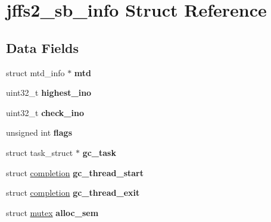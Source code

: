 \hypertarget{structjffs2__sb__info}{}\section{jffs2\+\_\+sb\+\_\+info Struct Reference}
\label{structjffs2__sb__info}
\subsection*{Data Fields}
\begin{DoxyCompactItemize}
\item 
\mbox{\label{structjffs2__sb__info_a4fc438f81838d3839d57f85c8c536859}} 
struct mtd\+\_\+info $\ast$ {\bfseries mtd}
\item 
\mbox{\label{structjffs2__sb__info_a8c24263d5c9b631d56e2a416c4828e32}} 
uint32\+\_\+t {\bfseries highest\+\_\+ino}
\item 
\mbox{\label{structjffs2__sb__info_a955083b968410d9096f6936f01c4c2cb}} 
uint32\+\_\+t {\bfseries check\+\_\+ino}
\item 
\mbox{\label{structjffs2__sb__info_a57ab69c2641ad4eba81fa92dab43bd8b}} 
unsigned int {\bfseries flags}
\item 
\mbox{\label{structjffs2__sb__info_ab18f6a89fdc140db5bdce82377de4a8d}} 
struct task\+\_\+struct $\ast$ {\bfseries gc\+\_\+task}
\item 
\mbox{\label{structjffs2__sb__info_abb08e44794739b8bf72bc81d42433207}} 
struct \mbox{\hyperlink{structcompletion}{completion}} {\bfseries gc\+\_\+thread\+\_\+start}
\item 
\mbox{\label{structjffs2__sb__info_a05c67aa93342f43c6510e8c881455d9a}} 
struct \mbox{\hyperlink{structcompletion}{completion}} {\bfseries gc\+\_\+thread\+\_\+exit}
\item 
\mbox{\label{structjffs2__sb__info_a29d49743eb479da60cb4bce2e50c021a}} 
struct \mbox{\hyperlink{structmutex}{mutex}} {\bfseries alloc\+\_\+sem}
\item 
\mbox{\label{structjffs2__sb__info_a6520f9f9873082530494050b3d8f924c}} 

\end{DoxyCompactItemize}
